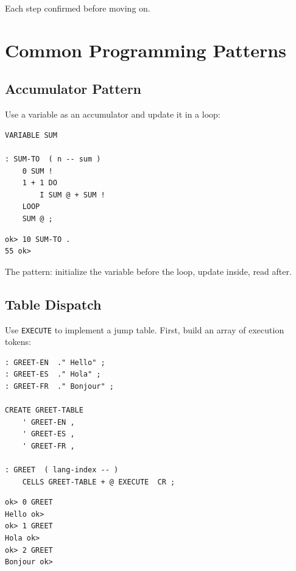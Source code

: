 Each step confirmed before moving on.

\chapter{Common Programming Patterns}
\label{chap:patterns}

\section{Accumulator Pattern}
\label{sec:pattern-accumulator}

Use a variable as an accumulator and update it in a loop:

\begin{lstlisting}[language=Forth]
VARIABLE SUM

: SUM-TO  ( n -- sum )
    0 SUM !
    1 + 1 DO
        I SUM @ + SUM !
    LOOP
    SUM @ ;
\end{lstlisting}

\begin{lstlisting}[language=Forth]
ok> 10 SUM-TO .
55 ok>
\end{lstlisting}

The pattern: initialize the variable before the loop, update inside, read
after.

\section{Table Dispatch}
\label{sec:pattern-dispatch}

Use \texttt{EXECUTE} to implement a jump table. First, build an array of
execution tokens:

\begin{lstlisting}[language=Forth]
: GREET-EN  ." Hello" ;
: GREET-ES  ." Hola" ;
: GREET-FR  ." Bonjour" ;

CREATE GREET-TABLE
    ' GREET-EN ,
    ' GREET-ES ,
    ' GREET-FR ,

: GREET  ( lang-index -- )
    CELLS GREET-TABLE + @ EXECUTE  CR ;
\end{lstlisting}

\begin{lstlisting}[language=Forth]
ok> 0 GREET
Hello ok>
ok> 1 GREET
Hola ok>
ok> 2 GREET
Bonjour ok>
\end{lstlisting}

